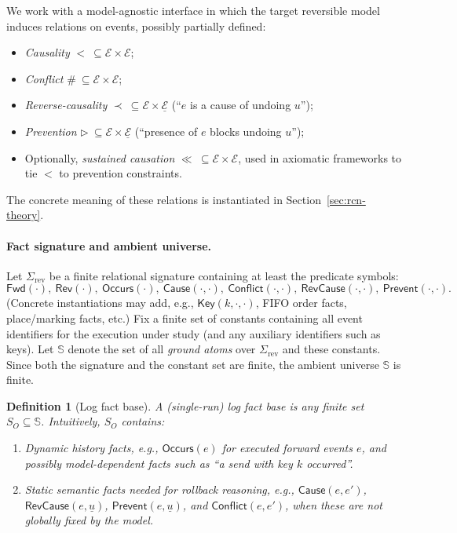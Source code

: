 \documentclass[twoside]{article}
\newtheorem{definition}[theorem]{Definition}
\newcommand{\1}{\mathbf{1}}
\begin{document}
We work with a model-agnostic interface in which the target reversible model induces relations on events, possibly partially defined:
\begin{itemize}
  \item \emph{Causality} \(<\ \subseteq \mathcal{E}\times \mathcal{E}\);
  \item \emph{Conflict} \(\#\ \subseteq \mathcal{E}\times \mathcal{E}\);
  \item \emph{Reverse-causality} \(\prec\ \subseteq \mathcal{E}\times \underline{\mathcal{E}}\) (``\(e\) is a cause of undoing \(u\)'');
  \item \emph{Prevention} \(\triangleright\ \subseteq \mathcal{E}\times \underline{\mathcal{E}}\) (``presence of \(e\) blocks undoing \(u\)'');
  \item Optionally, \emph{sustained causation} \(\ll\ \subseteq \mathcal{E}\times \mathcal{E}\), used in axiomatic frameworks to tie
        \(<\) to prevention constraints.
\end{itemize}
The concrete meaning of these relations is instantiated in Section~\ref{sec:rcn-theory}.

\paragraph{Fact signature and ambient universe.}
Let \(\Sigma_{\mathrm{rev}}\) be a finite relational signature containing at least the predicate symbols:
\[
\mathsf{Fwd}(\cdot),\ \mathsf{Rev}(\cdot),\ \mathsf{Occurs}(\cdot),\ 
\mathsf{Cause}(\cdot,\cdot),\ \mathsf{Conflict}(\cdot,\cdot),\ 
\mathsf{RevCause}(\cdot,\cdot),\ \mathsf{Prevent}(\cdot,\cdot).
\]
(Concrete instantiations may add, e.g., \(\mathsf{Key}(k,\cdot,\cdot)\), FIFO order facts, place/marking facts, etc.)
Fix a finite set of constants containing all event identifiers for the execution under study (and any auxiliary identifiers such as keys).
Let \(\mathbb{S}\) denote the set of all \emph{ground atoms} over \(\Sigma_{\mathrm{rev}}\) and these constants.
Since both the signature and the constant set are finite, the ambient universe \(\mathbb{S}\) is finite.

\begin{definition}[Log fact base]
\label{def:log-fact-base}
A (single-run) \emph{log fact base} is any finite set \(S_O\subseteq\mathbb{S}\).
Intuitively, \(S_O\) contains:
\begin{enumerate}
  \item \emph{Dynamic history facts}, e.g., \(\mathsf{Occurs}(e)\) for executed forward events \(e\),
        and possibly model-dependent facts such as ``a send with key \(k\) occurred''.
  \item \emph{Static semantic facts} needed for rollback reasoning, e.g., \(\mathsf{Cause}(e,e')\),
        \(\mathsf{RevCause}(e,\underline{u})\), \(\mathsf{Prevent}(e,\underline{u})\), and \(\mathsf{Conflict}(e,e')\),
        when these are not globally fixed by the model.
\end{enumerate}
\end{definition}
\end{document}
